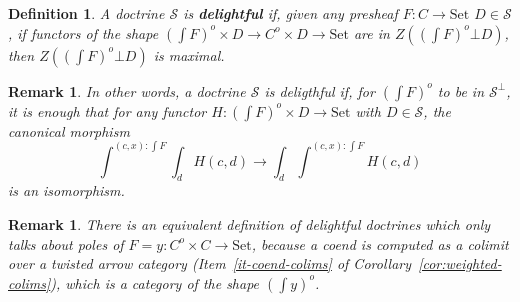 \documentclass{article}
\newcommand{\Set}{\text{Set}}
\newtheorem{definition}[theorem]{Definition}
\newtheorem{remark}[theorem]{Remark}
\newtheorem{lemma}[theorem]{Lemma}
\begin{document}
\begin{definition}
  A doctrine $\mathcal{S}$ is 
  \textbf{delightful} if, given any presheaf $F:C\rightarrow \Set$
  $D \in \mathcal{S}$, if functors of the shape $(\int F)^o \times D \rightarrow C^o
  \times D \rightarrow \Set$ are in $Z((\int F)^o \bot D)$, then 
  $Z((\int F)^o \bot D)$ is maximal.
\end{definition}
\begin{remark}
  In other words, a doctrine $\mathcal{S}$ is deligthful if,
  for $(\int F)^o$ to be in $\mathcal{S}^\bot$, it is enough that
  for any functor
  $H:(\int F)^o \times D \rightarrow \Set$ with $D \in \mathcal{S}$, the 
  canonical morphism
  \[
    \int^{(c,x): \int F} \int_d H(c,d) \rightarrow
    \int_d \int^{(c,x): \int F}  H(c,d) 
  \]
  is an isomorphism.
\end{remark}
\begin{remark}
  There is an equivalent definition of delightful doctrines which only
  talks about poles of $F = y : C^o \times C \rightarrow \Set$,
  because a coend is computed as a colimit over a twisted arrow category
  (Item~\ref{it-coend-colims} of Corollary~\ref{cor:weighted-colims}), which is
  a category of the shape $(\int y)^o$.
\end{remark}
\end{document}
